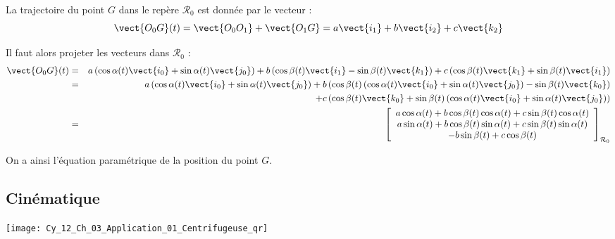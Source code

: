 \ifprof
\begin{corrige}
La trajectoire du point $G$ dans le repère $\mathcal{R}_0$  est donnée par le vecteur :
$$
\vect{O_0 G}(t)  = \vect{O_0O_1} + \vect{O_1G}
= a \vect{i_1} +  b \vect{i_2} + c \vect{k_2}
$$

Il faut alors projeter les vecteurs dans $\mathcal{R}_0$ : 
\begin{eqnarray*}
\vect{O_0 G}(t) &=& a \left(\cos\alpha(t) \vect{i_0} + \sin\alpha(t) \vect{j_0} \right) 
+ b \left(\cos\beta(t) \vect{i_1} - \sin\beta(t) \vect{k_1} \right) 
+ c\left(\cos\beta(t) \vect{k_1} + \sin\beta(t)\vect{i_1}\right)\\
&=& a \left(\cos\alpha(t) \vect{i_0} + \sin\alpha(t) \vect{j_0} \right) 
+ b \left(\cos\beta(t) \left(\cos\alpha(t) \vect{i_0} + \sin\alpha(t) \vect{j_0} \right) - \sin\beta(t) \vect{k_0} \right) \\
&& + c\left(\cos\beta(t) \vect{k_0} + \sin\beta(t)  \left(\cos\alpha(t) \vect{i_0} + \sin\alpha(t) \vect{j_0} \right) \right)\\
&=& \left[ \begin{array}{c} 
a \cos\alpha(t) + b \cos\beta(t) \cos\alpha(t) +c \sin\beta(t)\cos\alpha(t)\\
a \sin\alpha(t) + b \cos\beta(t) \sin\alpha(t) +c \sin\beta(t)\sin\alpha(t) \\
- b\sin\beta(t) + c\cos\beta(t)
\end{array}\right]_{\mathcal{R}_0}
\end{eqnarray*}

On a ainsi l'équation paramétrique de la position du point $G$.

\end{corrige}
\else \fi


\subsection*{Cinématique}
%
%




%


\ifprof
\else
\begin{marginfigure}
\centering
\texttt{[image: Cy\_12\_Ch\_03\_Application\_01\_Centrifugeuse\_qr]}
\end{marginfigure}
\fi


